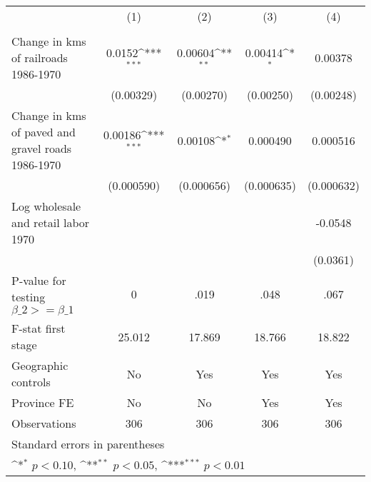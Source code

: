 {
\def\sym#1{\ifmmode^{#1}\else\(^{#1}\)\fi}
\begin{tabular}{l*{4}{c}}
\hline\hline
                &\multicolumn{1}{c}{(1)}&\multicolumn{1}{c}{(2)}&\multicolumn{1}{c}{(3)}&\multicolumn{1}{c}{(4)}\\
                &\multicolumn{1}{c}{}&\multicolumn{1}{c}{}&\multicolumn{1}{c}{}&\multicolumn{1}{c}{}\\
\hline
Change in kms of railroads 1986-1970&   0.0152\sym{***}&  0.00604\sym{**} &  0.00414\sym{*}  &  0.00378         \\
                &(0.00329)         &(0.00270)         &(0.00250)         &(0.00248)         \\
[1em]
Change in kms of paved and gravel roads 1986-1970&  0.00186\sym{***}&  0.00108\sym{*}  & 0.000490         & 0.000516         \\
                &(0.000590)         &(0.000656)         &(0.000635)         &(0.000632)         \\
[1em]
Log wholesale and retail labor 1970&                  &                  &                  &  -0.0548         \\
                &                  &                  &                  & (0.0361)         \\
\hline
P-value for testing $\beta\_{2} >= \beta\_{1}$&        0         &     .019         &     .048         &     .067         \\
F-stat first stage&   25.012         &   17.869         &   18.766         &   18.822         \\
Geographic controls&       No         &      Yes         &      Yes         &      Yes         \\
Province FE     &       No         &       No         &      Yes         &      Yes         \\
Observations    &      306         &      306         &      306         &      306         \\
\hline\hline
\multicolumn{5}{l}{\footnotesize Standard errors in parentheses}\\
\multicolumn{5}{l}{\footnotesize \sym{*} \(p<0.10\), \sym{**} \(p<0.05\), \sym{***} \(p<0.01\)}\\
\end{tabular}
}
